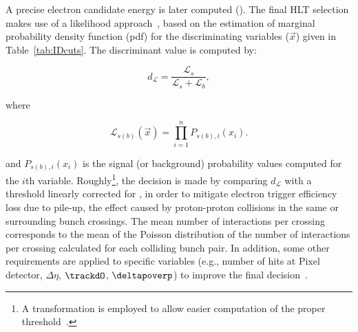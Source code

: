   


A precise electron candidate energy is later computed (\hltcalo). The final HLT selection makes use of a likelihood
approach~\cite{ATL-COM-PHYS-2017-1012,ATLAS-PERF-2017-01-002}, based on the estimation of marginal probability density function (pdf) for the discriminating variables ($\vec{x}$) given in Table~\ref{tab:IDcuts}. The discriminant value is computed by:




\begin{equation}
  d_{\mathcal{L}} = \frac{\mathcal{L}_{s}}{\mathcal{L}_{s} + \mathcal{L}_{b}},
\end{equation}
  
\noindent where
  
\begin{equation}
\mathcal{L}_{s(b)}(\vec{x}) = \prod_{i=1}^{n} P_{s(b),i}(x_i).
\label{eq:likelihoods}
\end{equation}



\noindent and $P_{s(b),i}(x_i)$ is the signal (or background) probability values computed for the $i$th variable. Roughly\footnote{A transformation is employed to allow
easier computation of the proper threshold~\cite{aaboud2019electron}.},
the decision is made by comparing $d_{\mathcal{L}}$ with a
threshold linearly corrected for \avgmu{}, in order to mitigate electron trigger
efficiency loss due to pile-up, the effect caused by proton-proton collisions in the same or surrounding bunch crossings. The mean number of interactions per crossing \avgmu{} corresponds to the
mean of the Poisson distribution of the number of interactions per crossing calculated for each colliding bunch pair. In addition, some other requirements are
applied to specific variables (e.g., number of hits at Pixel detector, $\Delta\eta$, $\trackdO$, $\deltapoverp$) to improve the final decision~\cite{aaboud2019electron}.

